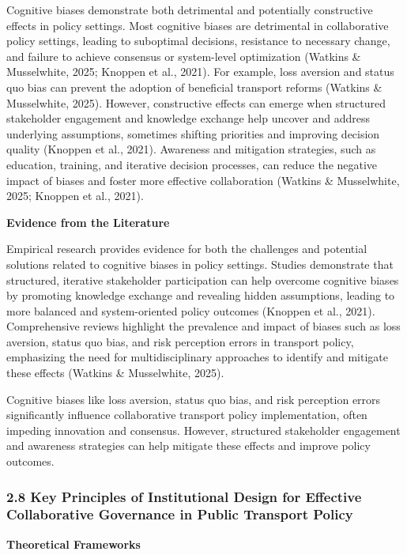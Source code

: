 Cognitive biases demonstrate both detrimental and potentially
constructive effects in policy settings. Most cognitive biases are
detrimental in collaborative policy settings, leading to suboptimal
decisions, resistance to necessary change, and failure to achieve
consensus or system-level optimization (Watkins \& Musselwhite, 2025;
Knoppen et al., 2021). For example, loss aversion and status quo bias
can prevent the adoption of beneficial transport reforms (Watkins \&
Musselwhite, 2025). However, constructive effects can emerge when
structured stakeholder engagement and knowledge exchange help uncover
and address underlying assumptions, sometimes shifting priorities and
improving decision quality (Knoppen et al., 2021). Awareness and
mitigation strategies, such as education, training, and iterative
decision processes, can reduce the negative impact of biases and foster
more effective collaboration (Watkins \& Musselwhite, 2025; Knoppen et
al., 2021).

\textbf{Evidence from the Literature}

Empirical research provides evidence for both the challenges and
potential solutions related to cognitive biases in policy settings.
Studies demonstrate that structured, iterative stakeholder participation
can help overcome cognitive biases by promoting knowledge exchange and
revealing hidden assumptions, leading to more balanced and
system-oriented policy outcomes (Knoppen et al., 2021). Comprehensive
reviews highlight the prevalence and impact of biases such as loss
aversion, status quo bias, and risk perception errors in transport
policy, emphasizing the need for multidisciplinary approaches to
identify and mitigate these effects (Watkins \& Musselwhite, 2025).

Cognitive biases like loss aversion, status quo bias, and risk
perception errors significantly influence collaborative transport policy
implementation, often impeding innovation and consensus. However,
structured stakeholder engagement and awareness strategies can help
mitigate these effects and improve policy outcomes.

\subsubsection{2.8 Key Principles of Institutional Design for Effective
Collaborative Governance in Public Transport
Policy}\label{key-principles-of-institutional-design-for-effective-collaborative-governance-in-public-transport-policy}

\textbf{Theoretical Frameworks}

